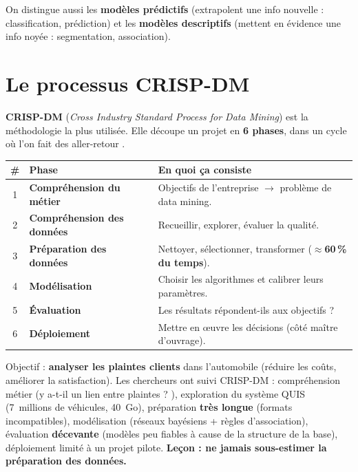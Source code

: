 On distingue aussi les \textbf{modèles prédictifs} (extrapolent une info nouvelle :
classification, prédiction) et les \textbf{modèles descriptifs} (mettent en évidence une info
noyée : segmentation, association).

\section{Le processus CRISP-DM}

\textbf{CRISP-DM} (\emph{Cross Industry Standard Process for Data Mining}) est la
méthodologie la plus utilisée. Elle découpe un projet en \textbf{6 phases}, dans un cycle
où l'on fait des \og aller-retour \fg{}.

\begin{center}
\renewcommand{\arraystretch}{1.25}
\begin{tabular}{c >{\bfseries}l p{9.5cm}}
\toprule
\# & Phase & En quoi ça consiste\\
\midrule
1 & Compréhension du métier & Objectifs de l'entreprise $\rightarrow$ problème de data mining.\\
2 & Compréhension des données & Recueillir, explorer, évaluer la qualité.\\
3 & Préparation des données & Nettoyer, sélectionner, transformer (\textbf{$\approx$60\,\% du temps}).\\
4 & Modélisation & Choisir les algorithmes et calibrer leurs paramètres.\\
5 & Évaluation & Les résultats répondent-ils aux objectifs ?\\
6 & Déploiement & Mettre en œuvre les décisions (côté maître d'ouvrage).\\
\bottomrule
\end{tabular}
\end{center}

\begin{Exemple}
Objectif : \textbf{analyser les plaintes clients} dans l'automobile (réduire les coûts,
améliorer la satisfaction). Les chercheurs ont suivi CRISP-DM : compréhension métier
(\og y a-t-il un lien entre plaintes ? \fg{}), exploration du système QUIS (7~millions de
véhicules, 40~Go), préparation \textbf{très longue} (formats incompatibles), modélisation
(réseaux bayésiens + règles d'association), évaluation \textbf{décevante} (modèles peu
fiables à cause de la structure de la base), déploiement limité à un projet pilote. \textbf{Leçon :
ne jamais sous-estimer la préparation des données.}
\end{Exemple}

